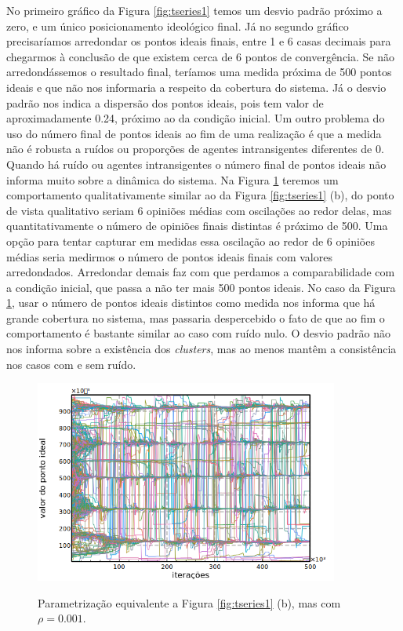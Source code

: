    No primeiro gráfico da Figura \ref{fig:tseries1} temos um desvio padrão
    próximo a zero, e um único posicionamento ideológico final. Já no segundo
    gráfico precisaríamos arredondar os pontos ideais finais, entre 1 e 6 casas
    decimais para chegarmos à conclusão de que existem cerca de 6 pontos de
    convergência. Se não arredondássemos o resultado final, teríamos uma medida
    próxima de 500 pontos ideais e que não nos informaria a respeito da
    cobertura do sistema. Já o desvio padrão nos indica a dispersão dos pontos
    ideais, pois tem valor de aproximadamente 0.24, próximo ao da condição
    inicial. Um outro problema do uso do número final de pontos ideais ao fim de
    uma realização é que a medida não é robusta a ruídos ou proporções de
    agentes intransigentes diferentes de 0. Quando há ruído ou agentes
    intransigentes o número final de pontos ideais não informa muito sobre a
    dinâmica do sistema. Na Figura \ref{fig:nonnullrho} teremos um comportamento
    qualitativamente similar ao da Figura \ref{fig:tseries1} (b), do ponto de
    vista qualitativo seriam 6 opiniões médias com oscilações ao redor delas,
    mas quantitativamente o número de opiniões finais distintas é próximo de
    500. Uma opção para tentar capturar em medidas essa oscilação ao redor de 6
    opiniões médias seria medirmos o número de pontos ideais finais com valores
    arredondados. Arredondar demais faz com que perdamos a comparabilidade com a
    condição inicial, que passa a não ter mais 500 pontos ideais. No caso da
    Figura \ref{fig:nonnullrho}, usar o número de pontos ideais distintos como
    medida nos informa que há grande cobertura no sistema, mas passaria
    despercebido o fato de que ao fim o comportamento é bastante similar ao caso
    com ruído nulo. O desvio padrão não nos informa sobre a existência dos
    \textit{clusters}, mas ao menos mantêm a consistência nos casos com e sem
    ruído.
    
  \begin{figure}[H]
    \centering
    \caption{Parametrização equivalente a Figura \ref{fig:tseries1} (b),
      mas com \(\rho = 0.001\).}
    \includegraphics[width =10cm]{ims/ts5.png}
    \label{fig:nonnullrho}
  \end{figure}


